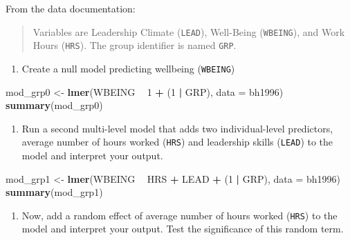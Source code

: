 \documentclass[]{book}
\newenvironment{Shaded}{\begin{snugshade}}{\end{snugshade}}
\newcommand{\KeywordTok}[1]{\textcolor[rgb]{0.13,0.29,0.53}{\textbf{#1}}}
\newcommand{\DataTypeTok}[1]{\textcolor[rgb]{0.13,0.29,0.53}{#1}}
\newcommand{\DecValTok}[1]{\textcolor[rgb]{0.00,0.00,0.81}{#1}}
\newcommand{\StringTok}[1]{\textcolor[rgb]{0.31,0.60,0.02}{#1}}
\newcommand{\OperatorTok}[1]{\textcolor[rgb]{0.81,0.36,0.00}{\textbf{#1}}}
\newcommand{\NormalTok}[1]{#1}
\providecommand{\tightlist}{%
  \setlength{\itemsep}{0pt}\setlength{\parskip}{0pt}}
\begin{document}
From the data documentation:

\begin{quote}
Variables are Leadership Climate (\texttt{LEAD}), Well-Being
(\texttt{WBEING}), and Work Hours (\texttt{HRS}). The group identifier
is named \texttt{GRP}.
\end{quote}

\begin{enumerate}
\def\labelenumi{\arabic{enumi}.}
\tightlist
\item
  Create a null model predicting wellbeing (\texttt{WBEING})
\end{enumerate}

\begin{Shaded}
\begin{Highlighting}[]
\NormalTok{  mod_grp0 <-}\StringTok{ }\KeywordTok{lmer}\NormalTok{(WBEING }\OperatorTok{~}\StringTok{ }\DecValTok{1} \OperatorTok{+}\StringTok{ }\NormalTok{(}\DecValTok{1} \OperatorTok{|}\StringTok{ }\NormalTok{GRP), }\DataTypeTok{data =}\NormalTok{ bh1996)}
  \KeywordTok{summary}\NormalTok{(mod_grp0)}
\end{Highlighting}
\end{Shaded}

\begin{enumerate}
\def\labelenumi{\arabic{enumi}.}
\setcounter{enumi}{2}
\tightlist
\item
  Run a second multi-level model that adds two individual-level
  predictors, average number of hours worked (\texttt{HRS}) and
  leadership skills (\texttt{LEAD}) to the model and interpret your
  output.
\end{enumerate}

\begin{Shaded}
\begin{Highlighting}[]
\NormalTok{  mod_grp1 <-}\StringTok{ }\KeywordTok{lmer}\NormalTok{(WBEING }\OperatorTok{~}\StringTok{ }\NormalTok{HRS }\OperatorTok{+}\StringTok{ }\NormalTok{LEAD }\OperatorTok{+}\StringTok{ }\NormalTok{(}\DecValTok{1} \OperatorTok{|}\StringTok{ }\NormalTok{GRP), }\DataTypeTok{data =}\NormalTok{ bh1996)}
  \KeywordTok{summary}\NormalTok{(mod_grp1)}
\end{Highlighting}
\end{Shaded}

\begin{enumerate}
\def\labelenumi{\arabic{enumi}.}
\setcounter{enumi}{2}
\tightlist
\item
  Now, add a random effect of average number of hours worked
  (\texttt{HRS}) to the model and interpret your output. Test the
  significance of this random term.
\end{enumerate}
\end{document}
